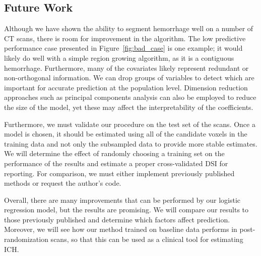 \documentclass[12pt]{report}
\begin{document}
\begin{refsection}
\chapter{Future Work}
Although we have shown the ability to segment hemorrhage well on a number of CT scans, there is room for improvement in the algorithm.  The low predictive performance case presented in Figure~\ref{fig:bad_case} is one example; it would likely do well with a simple region growing algorithm, as it is a contiguous hemorrhage.  Furthermore, many of the covariates likely represent redundant or non-orthogonal information.  We can drop groups of variables to detect which are important for accurate prediction at the population level.  Dimension reduction approaches such as principal components analysis can also be employed to reduce the size of the model, yet these may affect the interpretability of the coefficients.

Furthermore, we must validate our procedure on the test set of the scans.  Once a model is chosen, it should be estimated using all of the candidate voxels in the training data and not only the subsampled data to provide more stable estimates.  We will determine the effect of randomly choosing a training set on the performance of the results and estimate a proper cross-validated DSI for reporting.  For comparison, we must either implement previously published methods or request the author's code.

Overall, there are many improvements that can be performed by our logistic regression model, but the results are promising. We will compare our results to those previously published and determine which factors affect prediction.  Moreover, we will see how our method trained on baseline data performs in post-randomization scans, so that this can be used as a clinical tool for estimating ICH.


\thispagestyle{myheadings}

\printbibliography[title=References]
\end{refsection}
\end{document}
